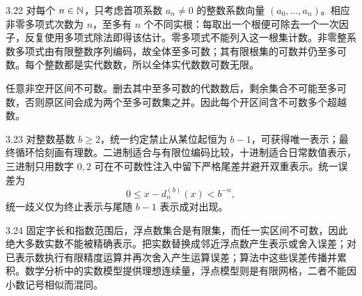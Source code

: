\begin{solution}{3.22}
对每个 \(n\in\mathbb{N}\)，只考虑首项系数 \(a_n\ne0\) 的整数系数向量 \((a_0,\ldots,a_n)\)。相应非零多项式次数为 \(n\)，至多有 \(n\) 个不同实根：每取出一个根便可除去一个一次因子，反复使用多项式除法即得该估计。零多项式不能列入这一根集计数。非零整系数多项式由有限整数序列编码，故全体至多可数；其有限根集的可数并仍至多可数。每个整数都是实代数数，所以全体实代数数可数无限。

任意非空开区间不可数。删去其中至多可数的代数数后，剩余集合不可能至多可数，否则原区间会成为两个至多可数集之并。因此每个开区间含不可数多个超越数。
\end{solution}

\begin{solution}{3.23}
对整数基数 \(b\ge2\)，统一约定禁止从某位起恒为 \(b-1\)，可获得唯一表示；最终循环恰刻画有理数。二进制适合与有限位编码比较，十进制适合日常数值表示，三进制只用数字 \(0,2\) 可在不可数性注入中留下严格尾差并避开双重表示。统一误差为
\[
 0\le x-d_n^{(b)}(x)<b^{-n},
\]
统一歧义仅为终止表示与尾随 \(b-1\) 表示成对出现。
\end{solution}

\begin{solution}{3.24}
固定字长和指数范围后，浮点数集合是有限集，而任一实区间不可数，因此绝大多数实数不能被精确表示。把实数替换成邻近浮点数产生表示或舍入误差；对已表示数执行有限精度运算并再次舍入产生运算误差；算法中这些误差传播并累积。数学分析中的实数模型提供理想连续量，浮点模型则是有限网格，二者不能因小数记号相似而混同。
\end{solution}

